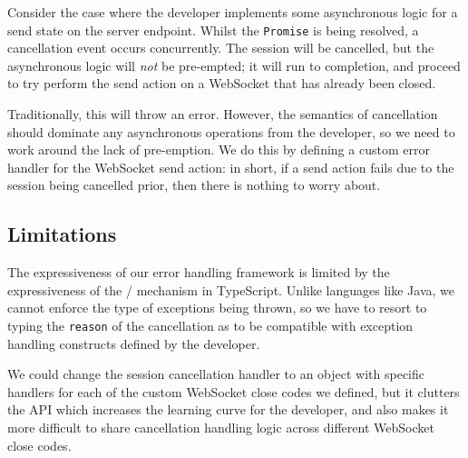 Consider the case where the developer implements
some asynchronous logic for a send state on the server endpoint. 
Whilst the \texttt{Promise} is being resolved, a cancellation
event occurs concurrently. The session will be cancelled, but
the asynchronous logic will \textit{not} be pre-empted; it
will run to completion, and proceed to try perform the send
action on a WebSocket that has already been closed.

Traditionally, this will throw an error. However,
the semantics of cancellation should dominate any asynchronous
operations from the developer, so we need to work around
the lack of pre-emption. We do this by defining a custom
error handler for the WebSocket send action: in short,
if a send action fails due to the session
being cancelled prior, then there is nothing to worry about.

\subsection{Limitations}
\label{subsection:errorlimit}

The expressiveness of our error handling framework is
limited by the expressiveness of the 
 /  mechanism
in TypeScript.
Unlike languages like Java, we cannot enforce the type
of exceptions being thrown, so we have to resort to
typing the \texttt{reason} of the cancellation as 
 to be compatible with 
exception handling constructs defined by the developer.

We could change the session cancellation handler
to an object with specific handlers for each of the
custom WebSocket close codes we defined, but it
clutters the API which increases the learning
curve for the developer, and also makes it
more difficult to share cancellation handling logic
across different WebSocket close codes.